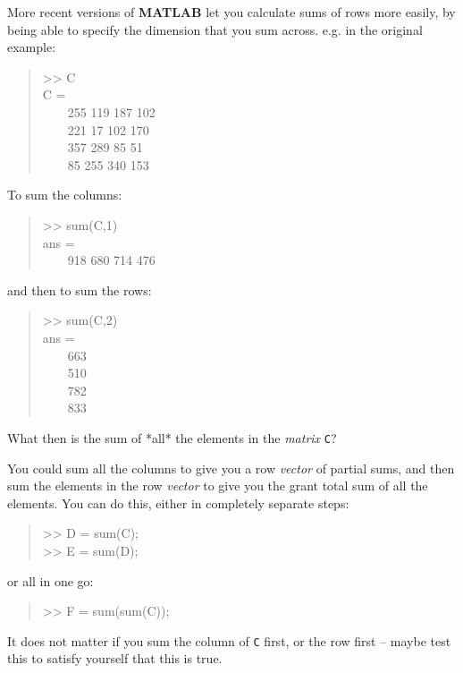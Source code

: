 \documentclass{tufte-book} %
\newenvironment{docspec}{\begin{quotation}\ttfamily\parskip0pt\parindent0pt\ignorespaces}{\end{quotation}}
\begin{document}
More recent versions of \textbf{MATLAB} let you calculate sums of rows more easily, by being able to specify the dimension that you sum across. e.g. in the original example:
\begin{docspec}
>> C\\
C =\\
\ \ \ \ 255   119   187   102\\
\ \ \ \ 221    17   102   170\\
\ \ \ \ 357   289    85    51\\
\ \ \ \ 85   255   340   153\\
\vspace{2mm}
\end{docspec}
To sum the columns:
\begin{docspec}
>> sum(C,1)\\
ans =\\
\ \ \ \ 918   680   714   476\\
\end{docspec}
and then to sum the rows:
\begin{docspec}
>> sum(C,2)\\
ans = \\
\ \ \ \ 663\\
\ \ \ \ 510\\
\ \ \ \ 782\\
\ \ \ \ 833
\end{docspec}


What then is the sum of *all* the elements in the \textit{matrix} \texttt{C}?

You could sum all the columns to give you a row \textit{vector} of partial sums, and then sum the elements in the row \textit{vector} to give you the grant total sum of all the elements. You can do this, either in completely separate steps:
\begin{docspec}
>> D = sum(C);\\
>> E = sum(D);
\end{docspec}
or all in one go:
\begin{docspec}
>> F = sum(sum(C));
\end{docspec}

It does not matter if you sum the column of \texttt{C} first, or the row first -- maybe test this to satisfy yourself that this is true.
\end{document}
